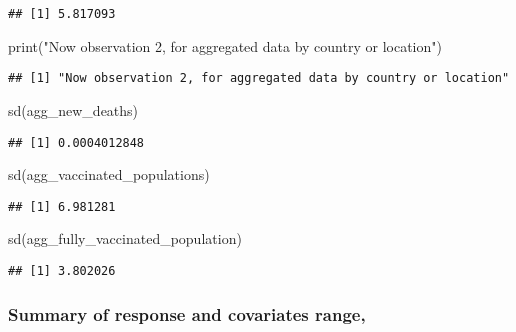 \documentclass[
  12pt,
]{article}
\newenvironment{Shaded}{\begin{snugshade}}{\end{snugshade}}
\newcommand{\FunctionTok}[1]{\textcolor[rgb]{0.00,0.00,0.00}{#1}}
\newcommand{\NormalTok}[1]{#1}
\newcommand{\StringTok}[1]{\textcolor[rgb]{0.31,0.60,0.02}{#1}}
\begin{document}
\begin{verbatim}
## [1] 5.817093
\end{verbatim}

\begin{Shaded}
\begin{Highlighting}[]
\FunctionTok{print}\NormalTok{(}\StringTok{"Now observation 2, for aggregated data by country or location"}\NormalTok{)}
\end{Highlighting}
\end{Shaded}

\begin{verbatim}
## [1] "Now observation 2, for aggregated data by country or location"
\end{verbatim}

\begin{Shaded}
\begin{Highlighting}[]
\FunctionTok{sd}\NormalTok{(agg\_new\_deaths)}
\end{Highlighting}
\end{Shaded}

\begin{verbatim}
## [1] 0.0004012848
\end{verbatim}

\begin{Shaded}
\begin{Highlighting}[]
\FunctionTok{sd}\NormalTok{(agg\_vaccinated\_populations)}
\end{Highlighting}
\end{Shaded}

\begin{verbatim}
## [1] 6.981281
\end{verbatim}

\begin{Shaded}
\begin{Highlighting}[]
\FunctionTok{sd}\NormalTok{(agg\_fully\_vaccinated\_population)}
\end{Highlighting}
\end{Shaded}

\begin{verbatim}
## [1] 3.802026
\end{verbatim}

\hypertarget{summary-of-response-and-covariates-range}{%
\subsubsection{Summary of response and covariates
range,}\label{summary-of-response-and-covariates-range}}
\end{document}
